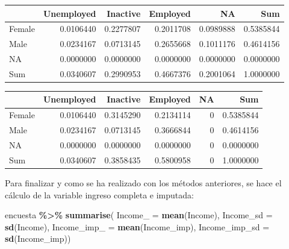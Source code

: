 \documentclass[
  12pt,
]{book}
\newenvironment{Shaded}{\begin{snugshade}}{\end{snugshade}}
\newcommand{\AttributeTok}[1]{\textcolor[rgb]{0.13,0.29,0.53}{#1}}
\newcommand{\FunctionTok}[1]{\textcolor[rgb]{0.13,0.29,0.53}{\textbf{#1}}}
\newcommand{\NormalTok}[1]{#1}
\newcommand{\SpecialCharTok}[1]{\textcolor[rgb]{0.81,0.36,0.00}{\textbf{#1}}}
\newcommand{\StringTok}[1]{\textcolor[rgb]{0.31,0.60,0.02}{#1}}
\begin{document}
\begin{tabular}{l|r|r|r|r|r}
\hline
  & Unemployed & Inactive & Employed & NA & Sum\\
\hline
Female & 0.0106440 & 0.2277807 & 0.2011708 & 0.0989888 & 0.5385844\\
\hline
Male & 0.0234167 & 0.0713145 & 0.2655668 & 0.1011176 & 0.4614156\\
\hline
NA & 0.0000000 & 0.0000000 & 0.0000000 & 0.0000000 & 0.0000000\\
\hline
Sum & 0.0340607 & 0.2990953 & 0.4667376 & 0.2001064 & 1.0000000\\
\hline
\end{tabular}

\begin{Shaded}
\end{Shaded}

\begin{tabular}{l|r|r|r|r|r}
\hline
  & Unemployed & Inactive & Employed & NA & Sum\\
\hline
Female & 0.0106440 & 0.3145290 & 0.2134114 & 0 & 0.5385844\\
\hline
Male & 0.0234167 & 0.0713145 & 0.3666844 & 0 & 0.4614156\\
\hline
NA & 0.0000000 & 0.0000000 & 0.0000000 & 0 & 0.0000000\\
\hline
Sum & 0.0340607 & 0.3858435 & 0.5800958 & 0 & 1.0000000\\
\hline
\end{tabular}

Para finalizar y como se ha realizado con los métodos anteriores, se hace el cálculo de la variable ingreso completa e imputada:

\begin{Shaded}
\begin{Highlighting}[]
\NormalTok{encuesta }\SpecialCharTok{\%\textgreater{}\%} \FunctionTok{summarise}\NormalTok{(}
  \AttributeTok{Income\_ =} \FunctionTok{mean}\NormalTok{(Income),}
  \AttributeTok{Income\_sd =} \FunctionTok{sd}\NormalTok{(Income),}
  \AttributeTok{Income\_imp\_ =} \FunctionTok{mean}\NormalTok{(Income\_imp),}
  \AttributeTok{Income\_imp\_sd =} \FunctionTok{sd}\NormalTok{(Income\_imp))}
\end{Highlighting}
\end{Shaded}
\end{document}
